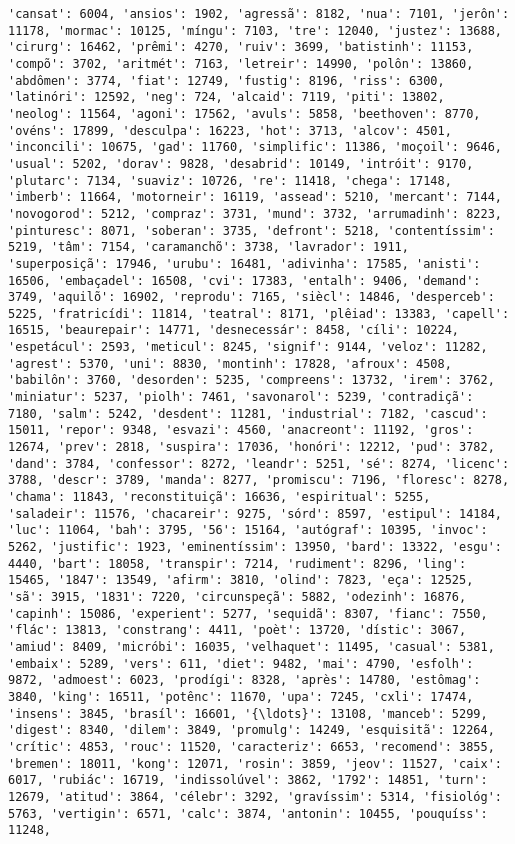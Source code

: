 \documentclass[11pt]{article}
\begin{document}
\begin{Verbatim}[commandchars=\\\{\}]
'cansat': 6004, 'ansios': 1902, 'agressã': 8182, 'nua': 7101, 'jerôn': 11178, 'mormac': 10125, 'míngu': 7103, 'tre': 12040, 'justez': 13688, 'cirurg': 16462, 'prêmi': 4270, 'ruiv': 3699, 'batistinh': 11153, 'compõ': 3702, 'aritmét': 7163, 'letreir': 14990, 'polôn': 13860, 'abdômen': 3774, 'fiat': 12749, 'fustig': 8196, 'riss': 6300, 'latinóri': 12592, 'neg': 724, 'alcaid': 7119, 'piti': 13802, 'neolog': 11564, 'agoni': 17562, 'avuls': 5858, 'beethoven': 8770, 'ovéns': 17899, 'desculpa': 16223, 'hot': 3713, 'alcov': 4501, 'inconcili': 10675, 'gad': 11760, 'simplific': 11386, 'moçoil': 9646, 'usual': 5202, 'dorav': 9828, 'desabrid': 10149, 'intróit': 9170, 'plutarc': 7134, 'suaviz': 10726, 're': 11418, 'chega': 17148, 'imberb': 11664, 'motorneir': 16119, 'assead': 5210, 'mercant': 7144, 'novogorod': 5212, 'compraz': 3731, 'mund': 3732, 'arrumadinh': 8223, 'pinturesc': 8071, 'soberan': 3735, 'defront': 5218, 'contentíssim': 5219, 'tâm': 7154, 'caramanchõ': 3738, 'lavrador': 1911, 'superposiçã': 17946, 'urubu': 16481, 'adivinha': 17585, 'anisti': 16506, 'embaçadel': 16508, 'cvi': 17383, 'entalh': 9406, 'demand': 3749, 'aquilõ': 16902, 'reprodu': 7165, 'siècl': 14846, 'desperceb': 5225, 'fratricídi': 11814, 'teatral': 8171, 'plêiad': 13383, 'capell': 16515, 'beaurepair': 14771, 'desnecessár': 8458, 'cíli': 10224, 'espetácul': 2593, 'meticul': 8245, 'signif': 9144, 'veloz': 11282, 'agrest': 5370, 'uni': 8830, 'montinh': 17828, 'afroux': 4508, 'babilôn': 3760, 'desorden': 5235, 'compreens': 13732, 'irem': 3762, 'miniatur': 5237, 'piolh': 7461, 'savonarol': 5239, 'contradiçã': 7180, 'salm': 5242, 'desdent': 11281, 'industrial': 7182, 'cascud': 15011, 'repor': 9348, 'esvazi': 4560, 'anacreont': 11192, 'gros': 12674, 'prev': 2818, 'suspira': 17036, 'honóri': 12212, 'pud': 3782, 'dand': 3784, 'confessor': 8272, 'leandr': 5251, 'sé': 8274, 'licenc': 3788, 'descr': 3789, 'manda': 8277, 'promiscu': 7196, 'floresc': 8278, 'chama': 11843, 'reconstituiçã': 16636, 'espiritual': 5255, 'saladeir': 11576, 'chacareir': 9275, 'sórd': 8597, 'estipul': 14184, 'luc': 11064, 'bah': 3795, '56': 15164, 'autógraf': 10395, 'invoc': 5262, 'justific': 1923, 'eminentíssim': 13950, 'bard': 13322, 'esgu': 4440, 'bart': 18058, 'transpir': 7214, 'rudiment': 8296, 'ling': 15465, '1847': 13549, 'afirm': 3810, 'olind': 7823, 'eça': 12525, 'sã': 3915, '1831': 7220, 'circunspeçã': 5882, 'odezinh': 16876, 'capinh': 15086, 'experient': 5277, 'sequidã': 8307, 'fianc': 7550, 'flác': 13813, 'constrang': 4411, 'poèt': 13720, 'dístic': 3067, 'amiud': 8409, 'micróbi': 16035, 'velhaquet': 11495, 'casual': 5381, 'embaix': 5289, 'vers': 611, 'diet': 9482, 'mai': 4790, 'esfolh': 9872, 'admoest': 6023, 'prodígi': 8328, 'après': 14780, 'estômag': 3840, 'king': 16511, 'potênc': 11670, 'upa': 7245, 'cxli': 17474, 'insens': 3845, 'brasíl': 16601, '{\ldots}': 13108, 'manceb': 5299, 'digest': 8340, 'dilem': 3849, 'promulg': 14249, 'esquisitã': 12264, 'crític': 4853, 'rouc': 11520, 'caracteriz': 6653, 'recomend': 3855, 'bremen': 18011, 'kong': 12071, 'rosin': 3859, 'jeov': 11527, 'caix': 6017, 'rubiác': 16719, 'indissolúvel': 3862, '1792': 14851, 'turn': 12679, 'atitud': 3864, 'célebr': 3292, 'gravíssim': 5314, 'fisiológ': 5763, 'vertigin': 6571, 'calc': 3874, 'antonin': 10455, 'pouquíss': 11248, 
\end{Verbatim}
\end{document}

